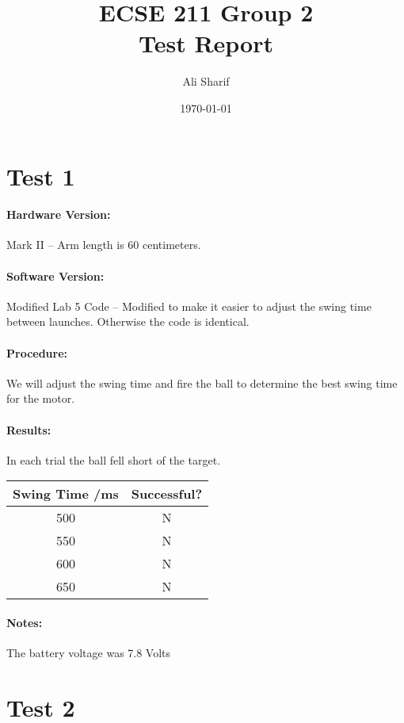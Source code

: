 \documentclass[12pt,letterpaper]{article}
\title{ECSE 211 Group 2 \\ Test Report}
\author{Ali Sharif}
\date{\today}
\begin{document}
	\maketitle
	
	\section{Test 1}
		\paragraph{Hardware Version:}Mark II -- Arm length is 60 centimeters.
		\paragraph{Software Version:}Modified Lab 5 Code -- Modified to make it easier to adjust the swing time between launches. Otherwise the code is identical. 
		
		\paragraph{Procedure:} We will adjust the swing time and fire the ball to determine the best swing time for the motor.
		\paragraph{Results:} In each trial the ball fell short of the target.
		
		\begin{center}
			\begin{tabular}{|c|c|}
				\hline 
				Swing Time /ms & Successful? \\ 
				\hline 
				500 & N \\ 
				\hline 
				550 & N \\ 
				\hline 
				600 & N \\ 
				\hline 
				650 & N \\ 
				\hline 
			\end{tabular}
		\end{center}
		
		\paragraph{Notes:} The battery voltage was 7.8 Volts

	\newpage
	\section{Test 2}
\end{document}
